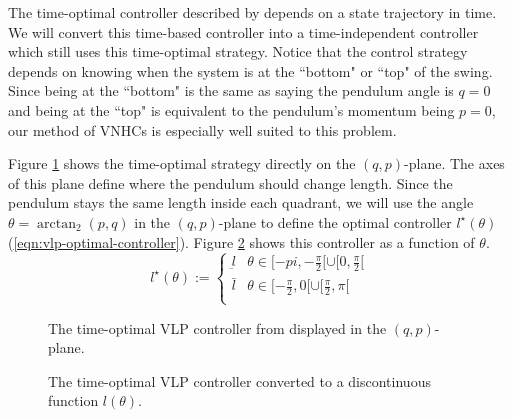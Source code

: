 The time-optimal controller described by \cite{pumping_swing_standing_squatting}
depends on a state trajectory in time. We will convert this time-based
controller into a time-independent controller which still uses this time-optimal
strategy. Notice that the control strategy depends on knowing when the
system is at the ``bottom" or ``top" of the swing. Since being at the ``bottom"
is the same as saying the pendulum angle is \(q = 0\) and being at the ``top" is
equivalent to the pendulum's momentum being \(p = 0\), our method of
VNHCs is especially well suited to this problem.

Figure \ref{fig:vlp-optimal-controller-qp-plane} shows the time-optimal strategy directly
on the \((q,p)\)-plane. The axes of this plane define where the pendulum should
change length. Since the pendulum stays the same length inside each quadrant, we
will use the angle \(\theta = \arctan_2(p,q)\) in the \((q,p)\)-plane to define
the optimal controller \(l^\star(\theta)\) (\ref{eqn:vlp-optimal-controller}).
Figure \ref{fig:vlp-optimal-controller} shows this controller as a function of
\(\theta\).
\begin{equation}\label{eqn:vlp-optimal-controller}
   l^\star(\theta):= \begin{cases}
      \underbar{l} & \theta \in [-pi, -\frac{\pi}{2}[ \cup [0,\frac{\pi}{2}[ \\
      \bar{l} & \theta \in [-\frac{\pi}{2},0[ \cup [\frac{\pi}{2}, \pi[ \\
   \end{cases}
\end{equation}

\begin{figure}
   \centering
   \caption{The time-optimal VLP controller from
   \cite{pumping_swing_standing_squatting} displayed in the
\((q,p)\)-plane.}\label{fig:vlp-optimal-controller-qp-plane}
\end{figure}

\begin{figure}
   \centering
   \caption{The time-optimal VLP controller converted to a discontinuous
   function \(l(\theta)\).}\label{fig:vlp-optimal-controller}
\end{figure}

